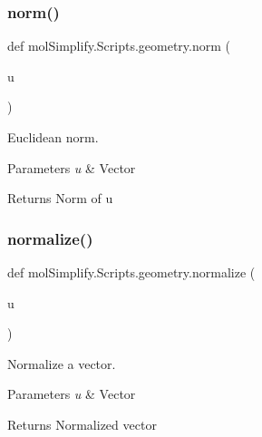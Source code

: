 \subsubsection{\texorpdfstring{norm()}{norm()}}
{\footnotesize\ttfamily def mol\+Simplify.\+Scripts.\+geometry.\+norm (\begin{DoxyParamCaption}\item[{}]{u }\end{DoxyParamCaption})}



Euclidean norm. 


\begin{DoxyParams}{Parameters}
{\em u} & Vector \\
\hline
\end{DoxyParams}
\begin{DoxyReturn}{Returns}
Norm of u 
\end{DoxyReturn}
\mbox{\label{namespacemolSimplify_1_1Scripts_1_1geometry_a6b3a18a3eb0c01b23c6acb6f374e1850}} 
\subsubsection{\texorpdfstring{normalize()}{normalize()}}
{\footnotesize\ttfamily def mol\+Simplify.\+Scripts.\+geometry.\+normalize (\begin{DoxyParamCaption}\item[{}]{u }\end{DoxyParamCaption})}



Normalize a vector. 


\begin{DoxyParams}{Parameters}
{\em u} & Vector \\
\hline
\end{DoxyParams}
\begin{DoxyReturn}{Returns}
Normalized vector 
\end{DoxyReturn}
\mbox{\label{namespacemolSimplify_1_1Scripts_1_1geometry_a0c9d5009b8beb6cb765756fe15596191}} 
